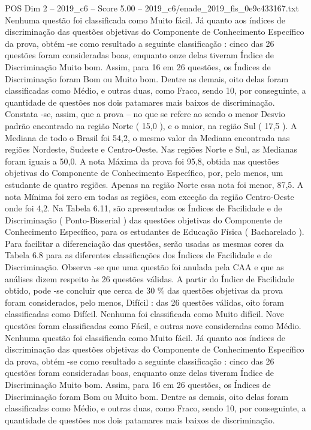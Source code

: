 \begin{textsample}{POS Dim 2 – 2019\_c6 – Score 5.00 – 2019\_c6/enade\_2019\_fis\_0e9c433167.txt}
Nenhuma questão foi classificada como Muito fácil.
Já quanto aos índices de discriminação das questões objetivas do Componente de Conhecimento Específico da prova, obtém -se como resultado a seguinte classificação : cinco das 26 questões foram consideradas boas, enquanto onze delas tiveram Índice de Discriminação Muito bom.
Assim, para 16 em 26 questões, os Índices de Discriminação foram Bom ou Muito bom.
Dentre as demais, oito delas foram classificadas como Médio, e outras duas, como Fraco, sendo 10, por conseguinte, a quantidade de questões nos dois patamares mais baixos de discriminação.
Constata -se, assim, que a prova – no que se refere ao sendo o menor Desvio padrão encontrado na região Norte ( 15,0 ), e o maior, na região Sul ( 17,5 ).
A Mediana de todo o Brasil foi 54,2, o mesmo valor da Mediana encontrada nas regiões Nordeste, Sudeste e Centro-Oeste.
Nas regiões Norte e Sul, as Medianas foram iguais a 50,0.
A nota Máxima da prova foi 95,8, obtida nas questões objetivas do Componente de Conhecimento Específico, por, pelo menos, um estudante de quatro regiões.
Apenas na região Norte essa nota foi menor, 87,5.
A nota Mínima foi zero em todas as regiões, com exceção da região Centro-Oeste onde foi 4,2.
Na Tabela 6.11, são apresentados os Índices de Facilidade e de Discriminação ( Ponto-Bisserial ) das questões objetivas do Componente de Conhecimento Específico, para os estudantes de Educação Física ( Bacharelado ).
Para facilitar a diferenciação das questões, serão usadas as mesmas cores da Tabela 6.8 para as diferentes classificações dos Índices de Facilidade e de Discriminação.
Observa -se que uma questão foi anulada pela CAA e que as análises dizem respeito às 26 questões válidas.
A partir do Índice de Facilidade obtido, pode -se concluir que cerca de 30 \% das questões objetivas da prova foram considerados, pelo menos, Difícil : das 26 questões válidas, oito foram classificadas como Difícil.
Nenhuma foi classificada como Muito difícil.
Nove questões foram classificadas como Fácil, e outras nove consideradas como Médio.
Nenhuma questão foi classificada como Muito fácil.
Já quanto aos índices de discriminação das questões objetivas do Componente de Conhecimento Específico da prova, obtém -se como resultado a seguinte classificação : cinco das 26 questões foram consideradas boas, enquanto onze delas tiveram Índice de Discriminação Muito bom.
Assim, para 16 em 26 questões, os Índices de Discriminação foram Bom ou Muito bom.
Dentre as demais, oito delas foram classificadas como Médio, e outras duas, como Fraco, sendo 10, por conseguinte, a quantidade de questões nos dois patamares mais baixos de discriminação.

\end{textsample}
